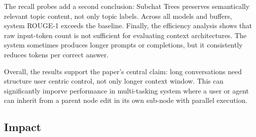 \documentclass[pdflatex,sn-mathphys-num]{sn-jnl}%
\theoremstyle{thmstyleone}%
\theoremstyle{thmstyletwo}%
\theoremstyle{thmstylethree}%
\begin{document}
The recall probes add a second conclusion: Subchat Trees preserves semantically relevant topic content, not only topic labels. Across all models and buffers, system ROUGE-1 exceeds the baseline. Finally, the efficiency analysis shows that raw input-token count is not sufficient for evaluating context architectures. The system sometimes produces longer prompts or completions, but it consistently reduces tokens per correct answer.

Overall, the results support the paper's central claim: long conversations need structure user centric control, not only longer context window. This can significantly imporve performance in multi-tasking system where a user or agent can inherit from a parent node edit in its own sub-node with parallel execution.









\subsection{Impact}\label{subsec:impact}
\end{document}
